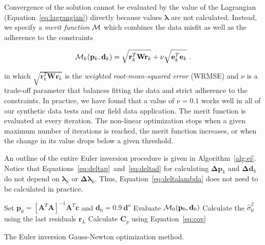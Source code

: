 Convergence of the solution cannot be evaluated by the value of the Lagrangian
(Equation~\ref{eq:lagrangian}) directly because values $\boldsymbol{\lambda}$ are
not calculated.
Instead, we specify a \textit{merit function} $\operatorname{\mathcal{M}}$ which combines the data
misfit as well as the adherence to the constraints

\begin{equation}
  \operatorname{\mathcal{M}}_k(\mathbf{p}_k, \mathbf{d}_k) =
  \sqrt{\mathbf{r}_k^T\mathbf{W}\mathbf{r}_k}
  + \nu\sqrt{\mathbf{e}_k^T\mathbf{e}_k}
  \ .
  \label{eq:merit}
\end{equation}

\noindent
in which $\sqrt{\mathbf{r}_k^T\mathbf{W}\mathbf{r}_k}$ is the 
\textit{weighted root-mean-squared error} (WRMSE) and
$\nu$ is a trade-off parameter that balances fitting the data and strict adherence 
to the constraints.
In practice, we have found that a value of $\nu=0.1$ works well in all of our
synthetic data tests and our field data application.
The merit function is evaluated at every iteration.
The non-linear optimization stops when a given maximum number of iterations is
reached, the merit function increases, or when the change in its value drops
below a given threshold.

An outline of the entire Euler inversion procedure is given in
Algorithm~\ref{alg:ei}.
Notice that Equations~\ref{eq:deltap}~and~\ref{eq:deltad} for calculating
$\mathbf{\Delta p}_k$ and $\mathbf{\Delta d}_k$ do not depend on
$\boldsymbol{\lambda}_k$ or $\boldsymbol{\Delta\lambda}_k$.
Thus, Equation~\ref{eq:deltalambda} does not need to be calculated in practice.

\begin{algorithm}[!h]
  Set
  $\mathbf{p}_0 = \left[\mathbf{A}^T\mathbf{A}\right]^{-1}\mathbf{A}^T\mathbf{c}$
  and $\mathbf{d}_0 = 0.9\ \mathbf{d}^o$
  \;
  Evaluate $\operatorname{\mathcal{M}}_0(\mathbf{p}_0, \mathbf{d}_0)$
  \;
  Calculate the $\hat{\sigma}_0^2$ using the last residuals $\mathbf{r}_L$
  \;
  Calculate $\mathbf{C}_p$ using Equation~\ref{eq:cov}
  \;
  \BlankLine
  \caption{The Euler inversion Gauss-Newton optimization method.}
  \label{alg:ei}
\end{algorithm}

